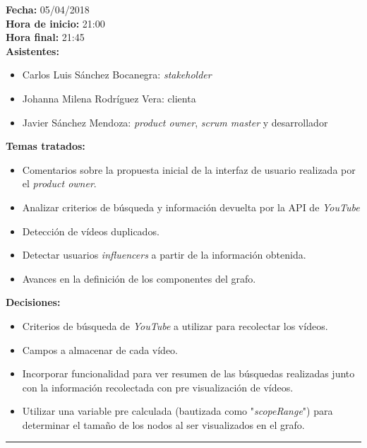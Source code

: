\documentclass[11pt,a4paper]{article}
\begin{document}
\noindent\textbf{Fecha:} 05/04/2018
\\
\noindent\textbf{Hora de inicio:} 21:00
\\
\noindent\textbf{Hora final:} 21:45
\\
\noindent\textbf{Asistentes:} 
\begin{itemize}
\item Carlos Luis Sánchez Bocanegra: \textit{stakeholder}
\item Johanna Milena Rodríguez Vera: clienta
\item Javier Sánchez Mendoza: \textit{product owner}, \textit{scrum master} y desarrollador
\end{itemize}
\noindent\textbf{Temas tratados:}
\begin{itemize}
\item Comentarios sobre la propuesta inicial de la interfaz de usuario realizada por el \textit{product owner}.
\item Analizar criterios de búsqueda y información devuelta por la API de \textit{YouTube}
\item Detección de vídeos duplicados.
\item Detectar usuarios \textit{influencers} a partir de la información obtenida.
\item Avances en la definición de los componentes del grafo.
\end{itemize}
\noindent\textbf{Decisiones:}
\begin{itemize}
\item Criterios de búsqueda de \textit{YouTube} a utilizar para recolectar los vídeos.
\item Campos a almacenar de cada vídeo.
\item Incorporar funcionalidad para ver resumen de las búsquedas realizadas junto con la información recolectada con pre visualización de vídeos.
\item Utilizar una variable pre calculada (bautizada como "\textit{scopeRange}") para determinar el tamaño de los nodos al ser visualizados en el grafo.
\end{itemize}

\begin{center}\rule{10cm}{0.4pt}\end{center}
\end{document}
